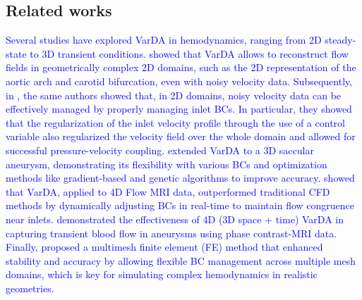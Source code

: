 \subsection*{Related works}
\label{sec:background}
\textcolor{blue}{Several studies have explored VarDA in hemodynamics, ranging from 2D steady-state to 3D transient conditions. \cite{Delia2012} showed that VarDA allows to reconstruct flow fields in geometrically complex 2D domains, such as the 2D representation of the aortic arch and carotid bifurcation, even with noisy velocity data. Subsequently, in \cite{Delia2013}, the same authors showed that, in 2D domains, noisy velocity data can be effectively managed by properly managing inlet BCs. In particular, they showed that the regularization of the inlet velocity profile through the use of a control variable also regularized the velocity field over the whole domain and allowed for successful pressure-velocity coupling. \cite{Tiago2017} extended VarDA to a 3D saccular aneurysm, demonstrating its flexibility with various BCs and optimization methods like gradient-based and genetic algorithms to improve accuracy. \cite{Koltukluoglu2018} showed that VarDA, applied to 4D Flow MRI data, outperformed traditional CFD methods by dynamically adjusting BCs in real-time to maintain flow congruence near inlets. \cite{Funke2019} demonstrated the effectiveness of 4D (3D space + time) VarDA in capturing transient blood flow in aneurysms using phase contrast-MRI data. Finally, \cite{Dokken2020} proposed a multimesh finite element (FE) method that enhanced stability and accuracy by allowing flexible BC management across multiple mesh domains, which is key for simulating complex hemodynamics in realistic geometries.}


